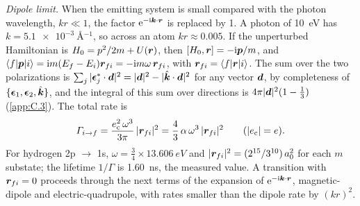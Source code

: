 \emph{Dipole limit.} When the emitting system is small compared with the photon wavelength, $kr \ll 1$, the factor $\mathrm{e}^{-\mathrm{i}\bm{k}\cdot\bm{r}}$ is replaced by 1. A photon of \SI{10}{eV} has $k = \SI{5.1e-3}{\angstrom^{-1}}$, so across an atom $kr \approx 0.005$. If the unperturbed Hamiltonian is $H_0 = p^2/2m + U(\bm{r})$, then $[H_0, \bm{r}] = -\mathrm{i}\bm{p}/m$, and $\langle f|\bm{p}|i\rangle = \mathrm{i} m(E_f - E_i)\bm{r}_{fi} = -\mathrm{i} m\omega\,\bm{r}_{fi}$, with $\bm{r}_{fi} = \langle f|\bm{r}|i\rangle$. The sum over the two polarizations is $\sum_j|\boldsymbol{\epsilon}^*_j\cdot\bm{d}|^2 = |\bm{d}|^2 - |\hat{\bm{k}}\cdot\bm{d}|^2$ for any vector $\bm{d}$, by completeness of $\{\boldsymbol{\epsilon}_1, \boldsymbol{\epsilon}_2, \hat{\bm{k}}\}$, and the integral of this sum over directions is $4\pi|\bm{d}|^2(1 - \tfrac13)$ (\cref{app:C.3}). The total rate is
\begin{equation}
  \varGamma_{i\to f} = \frac{e_{\mathrm{c}}^2\,\omega^3}{3\pi}\,|\bm{r}_{fi}|^2 = \frac43\,\alpha\,\omega^3\,|\bm{r}_{fi}|^2 \qquad (|e_{\mathrm{c}}| = e) .
  \label{eq:C.16-dipole}
\end{equation}
For hydrogen 2p $\to$ 1s, $\omega = \tfrac34\times\SI{13.606}{eV}$ and $|\bm{r}_{fi}|^2 = (2^{15}/3^{10})\,a_0^2$ for each $m$ substate; the lifetime $1/\varGamma$ is \SI{1.60}{ns}, the measured value. A transition with $\bm{r}_{fi} = 0$ proceeds through the next terms of the expansion of $\mathrm{e}^{-\mathrm{i}\bm{k}\cdot\bm{r}}$, magnetic-dipole and electric-quadrupole, with rates smaller than the dipole rate by $(kr)^2$.

